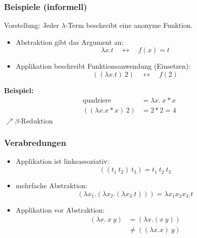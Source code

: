 \documentclass{beamer}
\begin{document}
\begin{frame} \frametitle{Beispiele (informell)}
	\footnotesize
	Vorstellung: Jeder $\lambda$-Term beschreibt eine anonyme Funktion. \pause
	\begin{itemize}[<+->]
		\item Abstraktion gibt das Argument an: 
		\begin{equation*}
		\lambda x . t \quad \leftrightarrow \quad f(x) = t
		\end{equation*}
		\item Applikation beschreibt Funktionsanwendung (Einsetzen): 
		\begin{equation*}
			((\lambda x . t) \ 2) \quad \leftrightarrow \quad f(2)
		\end{equation*}
	\end{itemize}

	\pause
	
	\textbf{Beispiel:}
	\begin{align*}
		\text{quadriere } &= \lambda x . \ x*x \\
		((\lambda x . x*x) \ 2) &= 2 * 2 = 4
	\end{align*}
	$\nearrow \beta$-Reduktion 
\end{frame}

\begin{frame} \frametitle{Verabredungen}
	\footnotesize
	\begin{itemize}[<+->]
		\item Applikation ist linksassoziativ:
		\begin{equation*}
			((t_1 \ t_2) \ t_3) = t_1 \ t_2 \ t_3 
		\end{equation*}
		\item mehrfache Abstraktion:
		\begin{equation*}
			(\lambda x_1 . (\lambda x_2 . (\lambda x_3 . t))) = \lambda x_1 x_2 x_3 . t 
		\end{equation*}
		\item Applikation vor Abstraktion:
		\begin{align*}
			(\lambda x . \ x \ y) &= (\lambda x . (x \ y)) \\
			&\neq ((\lambda x . x) \ y)
		\end{align*}
	\end{itemize}
\end{frame}
\end{document}
